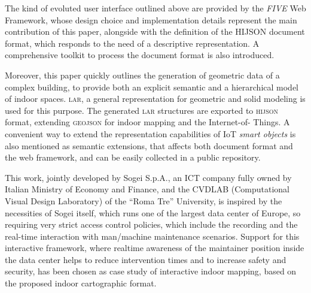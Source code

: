 The kind of evoluted user interface outlined above are provided by the
\emph{FIVE} Web Framework, whose design choice and implementation details
represent the main contribution of this paper, alongside with the definition
of the HIJSON document format, which responds to the need of a descriptive
representation. A comprehensive toolkit to process the document format is also
introduced.

Moreover, this paper quickly outlines the generation of geometric data of a
complex building, to provide both an explicit semantic and a hierarchical
model of indoor spaces. \textsc{\large lar}, a general representation for
geometric and solid modeling is used for this purpose. The generated
\textsc{\large lar} structures are exported to \textsc{\large hijson} format,
extending \textsc{\large geojson} for indoor mapping and the Internet-of-
Things. A convenient way to extend the representation capabilities of IoT
\emph{smart objects} is also mentioned as semantic extensions, that affects
both document format and the web framework, and can be easily collected in a
public repository.


This work, jointly developed by Sogei S.p.A., an ICT company fully owned by
Italian  Ministry of Economy and Finance, and the CVDLAB (Computational Visual
Design Laboratory) of the ``Roma Tre'' University, is inspired by the
necessities of Sogei itself, which runs one of the largest data center of
Europe, so requiring very strict access control policies, which include the
recording and the real-time interaction with man/machine maintenance
scenarios. Support for this interactive framework, where realtime awareness of
the maintainer position inside the data center helps to reduce intervention
times and to increase safety and security, has been chosen as case study of
interactive indoor mapping, based on the proposed indoor cartographic format.




